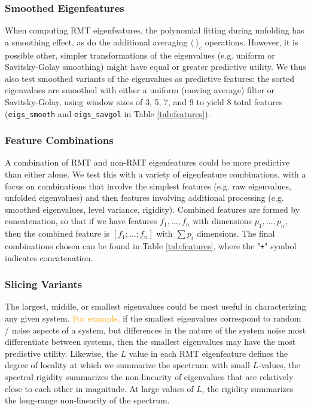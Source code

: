 \documentclass[12pt]{spieman}  %
\newcommand{\code}[1]{\small\texttt{#1}\normalsize}
\begin{document}
\begin{spacing}{2}
\subsubsection{Smoothed Eigenfeatures}
\label{sec:eigs-only}

When computing RMT eigenfeatures, the polynomial fitting during unfolding has a
smoothing effect, as do the additional averaging \(\langle\;\rangle_c\)
operations. However, it is possible other, simpler transformations of the
eigenvalues (e.g. uniform or Savitsky-Golay smoothing) might have equal or
greater predictive utility. We thus also test smoothed variants of the
eigenvalues as predictive features: the sorted eigenvalues are smoothed with
either a uniform (moving average) filter or Savitsky-Golay, using window sizes
of 3, 5, 7, and 9 to yield 8 total features (\code{eigs\_smooth} and
\code{eigs\_savgol} in Table \ref{tab:features}).


\subsubsection{Feature Combinations}

A combination of RMT and non-RMT eigenfeatures could be more predictive than
either alone. We test this with a variety of eigenfeature combinations, with a
focus on combinations that involve the simplest features (e.g. raw eigenvalues,
unfolded eigenvalues) and then features involving additional processing (e.g.
smoothed eigenvalues, level variance, rigidity). Combined features are formed
by concatenation, so that if we have features \(f_1, \dots,  f_n\) with
dimensions \(p_1, \dots, p_n\), then the combined feature is \([f_1; \dots;
f_n]\) with \(\sum p_i\) dimensions.  The final combinations chosen can be
found in Table \ref{tab:features}, where the "\code{+}" symbol indicates concatenation.


\subsubsection{Slicing Variants}

The largest, middle, or smallest eigenvalues could be most useful in
characterizing any given system. \textcolor{orange}{For example,} if the
smallest eigenvalues correspond to random / noise aspects of a system, but
differences in the nature of the system noise most differentiate between
systems, then the smallest eigenvalues may have the most predictive utility.
Likewise, the \(L\) value in each RMT eigenfeature defines the degree of
locality at which we summarize the spectrum: with small \(L\)-values, the
spectral rigidity summarizes the non-linearity of eigenvalues that are
relatively close to each other in magnitude. At large values of \(L\), the
rigidity summarizes the long-range non-linearity of the spectrum.


\end{spacing}
\end{document}
